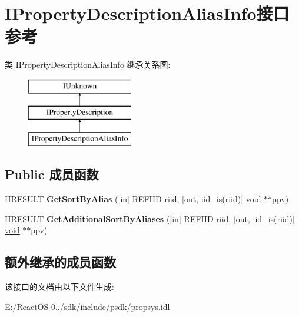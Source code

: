 \hypertarget{interface_i_property_description_alias_info}{}\section{I\+Property\+Description\+Alias\+Info接口 参考}
\label{interface_i_property_description_alias_info}
类 I\+Property\+Description\+Alias\+Info 继承关系图\+:\begin{figure}[H]
\begin{center}
\leavevmode
\includegraphics[height=3.000000cm]{interface_i_property_description_alias_info}
\end{center}
\end{figure}
\subsection*{Public 成员函数}
\begin{DoxyCompactItemize}
\item 
\mbox{\label{interface_i_property_description_alias_info_ab7797d7d1c97335b559364dd15d231d2}} 
H\+R\+E\+S\+U\+LT {\bfseries Get\+Sort\+By\+Alias} (\mbox{[}in\mbox{]} R\+E\+F\+I\+ID riid, \mbox{[}out, iid\+\_\+is(riid)\mbox{]} \hyperlink{interfacevoid}{void} $\ast$$\ast$ppv)
\item 
\mbox{\label{interface_i_property_description_alias_info_a43979713f651270b2ebf88676941c8f9}} 
H\+R\+E\+S\+U\+LT {\bfseries Get\+Additional\+Sort\+By\+Aliases} (\mbox{[}in\mbox{]} R\+E\+F\+I\+ID riid, \mbox{[}out, iid\+\_\+is(riid)\mbox{]} \hyperlink{interfacevoid}{void} $\ast$$\ast$ppv)
\end{DoxyCompactItemize}
\subsection*{额外继承的成员函数}


该接口的文档由以下文件生成\+:\begin{DoxyCompactItemize}
\item 
E\+:/\+React\+O\+S-\/0../sdk/include/psdk/propsys.\+idl\end{DoxyCompactItemize}
